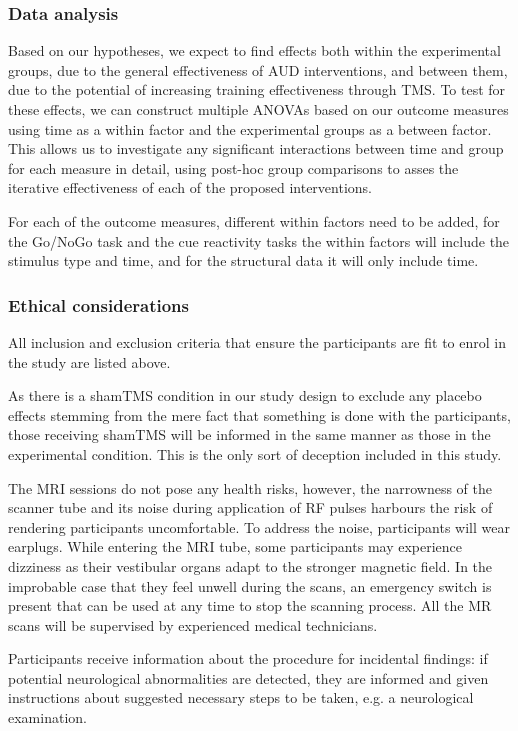 \documentclass[12pt]{article}
\begin{document}
\subsubsection{Data analysis}

Based on our hypotheses, we expect to find effects both within the experimental groups, due to the general effectiveness of AUD interventions, and between them, due to the potential of increasing training effectiveness through TMS. To test for these effects, we can construct multiple ANOVAs based on our outcome measures using time as a within factor and the experimental groups as a between factor. This allows us to investigate any significant interactions between time and group for each measure in detail, using post-hoc group comparisons to asses the iterative effectiveness of each of the proposed interventions.

For each of the outcome measures, different within factors need to be added, for the Go/NoGo task and the cue reactivity tasks the within factors will include the stimulus type and time, and for the structural data it will only include time.

\subsubsection{Ethical considerations}
All inclusion and exclusion criteria that ensure the participants are fit to enrol in the study are listed above.

As there is a shamTMS condition in our study design to exclude any placebo effects stemming from the mere fact that something is done with the participants, those receiving shamTMS will be informed in the same manner as those in the experimental condition. This is the only sort of deception included in this study. 

The MRI sessions do not pose any health risks, however, the narrowness of the scanner tube and its noise during application of RF pulses harbours the risk of rendering participants uncomfortable. To address the noise, participants will wear earplugs. While entering the MRI tube, some participants may experience dizziness as their vestibular organs adapt to the stronger magnetic field. In the improbable case that they feel unwell during the scans, an emergency switch is present that can be used at any time to stop the scanning process. All the MR scans will be supervised by experienced medical technicians. 

Participants receive information about the procedure for incidental findings: if potential neurological abnormalities are detected, they are informed and given instructions about suggested necessary steps to be taken, e.g. a neurological examination.
\end{document}
